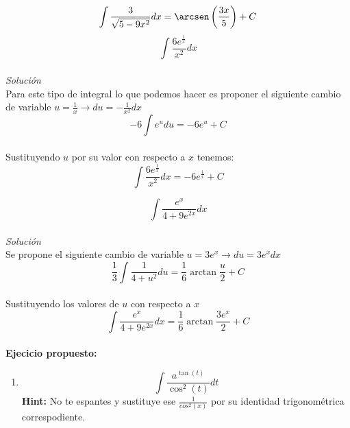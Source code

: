 \documentclass[10pt,executivepaper]{article}
\begin{document}
\[\int \frac{3}{\sqrt{5-9x^{2}}}dx = \arcsen\left(\frac{3x}{5}\right) + C\]
\vspace{1.5cm}
\clearpage
\[\int \frac{6 e^{\frac{1}{x}}}{x^{2}}dx\]\\
\textit{Solución}\\
Para este tipo de integral lo que podemos hacer es proponer el siguiente cambio de variable $u = \frac{1}{x} \rightarrow du=-\frac{1}{x^{2}}dx$\\
\[-6\int e^{u}du = -6 e^{u} + C \]\\
Sustituyendo $u$ por su valor con respecto a $x$ tenemos:\\
\[\int \frac{6 e^{\frac{1}{x}}}{x^{2}}dx=-6 e^{\frac{1}{x}} + C\]

\vspace{1cm}
\[\int\frac{e^{x}}{4 + 9 e^{2x}}dx\]
\\
\textit{Solución}\\
Se propone el siguiente cambio de variable $u=3e^{x}\rightarrow du= 3e^{x}dx$\\
\[\frac{1}{3}\int \frac{1}{4+u^{2}}du=\frac{1}{6}\arctan{\frac{u}{2}}+C\]
\\Sustituyendo los valores de $u$ con respecto a $x$\\
\[\int\frac{e^{x}}{4 + 9 e^{2x}}dx = \frac{1}{6}\arctan{\frac{3e^{x}}{2}}+C\]\\
\textbf{Ejecicio propuesto:}\\
\begin{enumerate}
  \item \[\int \frac{a^{\tan(t)}}{\cos^{2}(t)}dt\]
  \textbf{Hint:} No te espantes y sustituye ese $\frac{1}{cos^{2}(x)}$ por su identidad trigonométrica correspodiente.
\end{enumerate}


\clearpage
\end{document}
